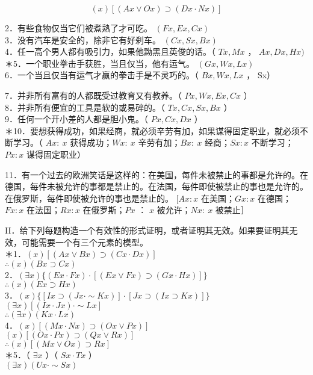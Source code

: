 $$
(x)[(A x \vee O x) \supset(D x \cdot N x)]
$$

2．有些食物仅当它们被煮熟了才可㫓。 $(F x, E x, C x)$\\
3．没有汽车是安全的，除非它有好刹车。 $(C x, S x, B x)$\\
4．任一高个男人都有吸引力，如果他黝黑且英俊的话。（ $T x, M x$ ， $A x, D x, H x)$\\
＊5．一个职业拳击手获胜，当且仅当，他有运气。 $(G x, W x, L x)$\\
6．一个当且仅当有运气才赢的拳击手是不灵巧的。（ $B x, W x, L x$ ， Sx）

7．并非所有富有的人都既受过教育又有教养。（ $P x, W x, E x, C x$ ）\\
8．并非所有便宜的工具是软的或易碎的。（ $T x, C x, S x, B x$ ）\\
9．任何一个开小差的人都是胆小鬼。（ $P x, C x, D x$ ）\\
＊10．要想获得成功，如果经商，就必须辛劳有加，如果谋得固定职业，就必须不断学习。（ $A x: ~ x$ 获得成功；$W x: ~ x$ 辛劳有加；$B x: ~ x$ 经商；$S x: x$ 不断学习；$P x: x$ 谋得固定职业）

11．有一个过去的欧洲笑话是这样的：在美国，每件未被禁止的事都是允许的。在德国，每件未被允许的事都是禁止的。在法国，每件即使被禁止的事也是允许的。在俄罗斯，每件即使被允许的事也是禁止的。 $[A x: x$ 在美国；$G x: x$ 在德国；$F x: x$ 在法国；$R x: x$ 在俄罗斯；$P x$ ： $x$ 被允许；$N x: ~ x$ 被禁止］

II．给下列每题构造一个有效性的形式证明，或者证明其无效。如果要证明其无效，可能需要一个有三个元素的模型。\\
＊1．$(x)[(A x \vee B x) \supset(C x \cdot D x)]$\\
$\therefore(x)(B x \supset C x)$\\
2．$(\exists x)\{(E x \cdot F x) \cdot[(E x \vee F x) \supset(G x \cdot H x)]\}$\\
$\therefore(x)(E x \supset H x)$\\
3．$(x)\{[I x \supset(J x \cdot \sim K x)] \cdot[J x \supset(I x \supset K x)]\}$\\
$(\exists x)[(I x \cdot J x) \cdot \sim L x]$\\
$\therefore(\exists x)(K x \cdot L x)$\\
4．$(x)[(M x \cdot N x) \supset(O x \vee P x)]$\\
$(x)[(O x \cdot P x) \supset(Q x \vee R x)]$\\
$\therefore(x)[(M x \vee O x) \supset R x]$\\
＊5．（ $\exists x$ ）（ $S x \cdot T x$ ）\\
$(\exists x)(U x \cdot \sim S x)$

